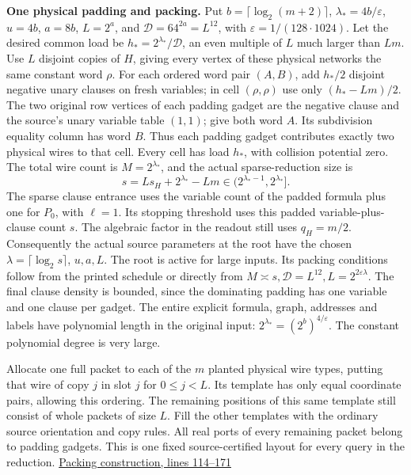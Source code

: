 \documentclass[11pt,a4paper]{article}
\begin{document}
\textbf{One physical padding and packing.} Put
\(b=\lceil\log_2(m+2)\rceil\), \(\lambda_* =4b/\varepsilon\), \(u=4b\),
\(a=8b\), \(L=2^a\), and \(\mathcal D=64^{2a}=L^{12}\), with
\(\varepsilon=1/(128\cdot1024)\). Let the desired common load be
\(h_*=2^{\lambda_*}/\mathcal D\), an even multiple of \(L\) much larger
than \(Lm\). Use \(L\) disjoint copies of \(H\), giving every vertex of
these physical networks the same constant word \(\rho\). For each
ordered word pair \((A,B)\), add \(h_*/2\) disjoint negative unary
clauses on fresh variables; in cell \((\rho,\rho)\) use only
\((h_*-Lm)/2\). The two original row vertices of each padding gadget are
the negative clause and the source's unary variable table \((1,1)\);
give both word \(A\). Its subdivision equality column has word \(B\).
Thus each padding gadget contributes exactly two physical wires to that
cell. Every cell has load \(h_*\), with collision potential zero. The
total wire count is \(M=2^{\lambda_*}\), and the actual sparse-reduction
size is \[
 s=L s_H+2^{\lambda_*}-Lm \in (2^{\lambda_*-1},2^{\lambda_*}].
\] The sparse clause entrance uses the variable count of the padded
formula plus one for \(P_0\), with \(\ell=1\). Its stopping threshold
uses this padded variable-plus-clause count \(s\). The algebraic
factor in the readout still uses \(q_H=m/2\). Consequently the actual
source parameters at the root have the chosen
\(\lambda=\lceil\log_2s\rceil\), \(u,a,L\). The root is active for large
inputs. Its packing conditions follow from the printed schedule or
directly from
\(M\asymp s,\mathcal D=L^{12}, L=2^{2\varepsilon\lambda}\). The final
clause density is bounded, since the dominating padding has one variable
and one clause per gadget. The entire explicit formula, graph, addresses
and labels have polynomial length in the original input:
\(2^{\lambda_*}=(2^b)^{4/\varepsilon}\). The constant polynomial degree
is very large.

Allocate one full packet to each of the \(m\) planted physical wire
types, putting that wire of copy \(j\) in slot \(j\) for \(0\le j<L\).
Its template has only equal coordinate pairs, allowing this ordering.
The remaining positions of this same template still consist of whole
packets of size \(L\). Fill the other templates with the ordinary source
orientation and copy rules. All real ports of every remaining packet
belong to padding gadgets. This is one fixed source-certified layout for
every query in the reduction.
\href{https://github.com/openai/math/blob/main/preprints/The-Exponential-Time-Hypothesis-is-False-October-25-2026/build/quantitative-contraction.tex\#L114}{Packing
construction, lines 114--171}
\end{document}
